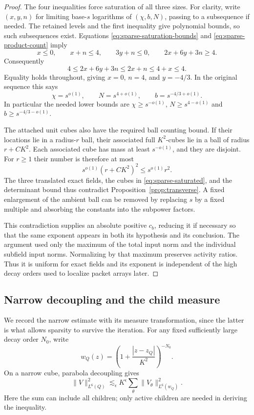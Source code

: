 \begin{proof}
The four inequalities force saturation of all three sizes.  For
clarity, write $(x,y,n)$ for limiting base-$s$ logarithms of
$(\chi,b,N)$, passing to a subsequence if needed.  The retained levels
and the first inequality give polynomial bounds, so such subsequences
exist.  Equations \eqref{eq:sparse-saturation-bounds} and
\eqref{eq:sparse-product-count} imply
\[
 x\le0,\qquad x+n\le4,\qquad 3y+n\le0,
 \qquad 2x+6y+3n\ge4.
\]
Consequently
\[
 4\le2x+6y+3n\le2x+n\le4+x\le4.
\]
Equality holds throughout, giving $x=0$, $n=4$, and $y=-4/3$.
In the original sequence this says
\begin{equation}\label{eq:sparse-saturated}
 \chi=s^{o(1)},\qquad N=s^{4+o(1)},\qquad b=s^{-4/3+o(1)}.
\end{equation}
In particular the needed lower bounds are
$\chi\ge s^{-o(1)}$, $N\ge s^{4-o(1)}$ and
$b\ge s^{-4/3-o(1)}$.

The attached unit cubes also have the required ball counting bound.
If their locations lie in a radius-$r$ ball, their associated full
$K^2$-cubes lie in a ball of radius $r+CK^2$.  Each associated cube has
mass at least $s^{-o(1)}$, and they are disjoint.  For $r\ge1$ their
number is therefore at most
\[
 s^{o(1)}(r+CK^2)^2\le s^{o(1)}r^2.
\]
The three translated exact fields, the cubes in
\eqref{eq:sparse-saturated}, and the determinant bound thus contradict
Proposition~\ref{prop:transverse}.  A fixed enlargement of the ambient
ball can be removed by replacing $s$ by a fixed multiple and absorbing
the constants into the subpower factors.

This contradiction supplies an absolute positive $c_b$, reducing it
if necessary so that the same exponent appears in both its hypothesis
and its conclusion.  The argument used only the maximum of the total
input norm and the individual subfield input norms.  Normalizing by
that maximum preserves activity ratios.  Thus it is uniform for exact
fields and its exponent is independent of the high decay orders used
to localize packet arrays later.
\end{proof}

\subsection{Narrow decoupling and the child measure}

We record the narrow estimate with its measure transformation, since
the latter is what allows sparsity to survive the iteration.  For any
fixed sufficiently large decay order $N_0$, write
\[
 w_Q(z)=\left(1+\frac{|z-z_Q|}{K^2}\right)^{-N_0}.
\]
On a narrow cube, parabola decoupling gives
\begin{equation}\label{eq:sparse-narrow-decoupling}
 \|V\|_{L^6(Q)}^2
    \lesssim_\epsilon K^\epsilon
          \sum_\theta\|V_\theta\|_{L^6(w_Q)}^2.
\end{equation}
Here the sum can include all children; only active children are needed
in deriving the inequality.

